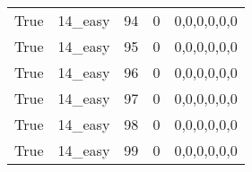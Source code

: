 \begin{tabular}{llrrl}
 True            & 14\_easy             &            94 &                     0 & 0,0,0,0,0,0   \\
 True            & 14\_easy             &            95 &                     0 & 0,0,0,0,0,0   \\
 True            & 14\_easy             &            96 &                     0 & 0,0,0,0,0,0   \\
 True            & 14\_easy             &            97 &                     0 & 0,0,0,0,0,0   \\
 True            & 14\_easy             &            98 &                     0 & 0,0,0,0,0,0   \\
 True            & 14\_easy             &            99 &                     0 & 0,0,0,0,0,0   \\
\hline
\end{tabular}